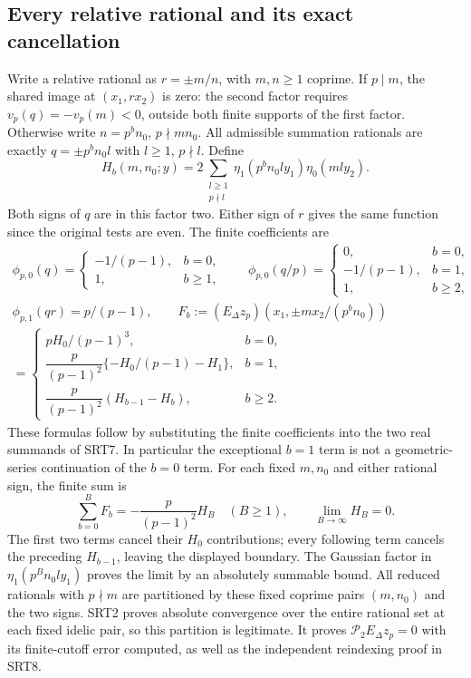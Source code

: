 \subsection{Every relative rational and its exact cancellation}
Write a relative rational as $r=\pm m/n$, with $m,n\ge1$ coprime.
If $p\mid m$, the shared image at $(x_1,rx_2)$ is zero: the second
factor requires $v_p(q)=-v_p(m)<0$, outside both finite supports of
the first factor. Otherwise write $n=p^b n_0$, $p\nmid mn_0$.
All admissible summation rationals are exactly
$q=\pm p^b n_0l$ with $l\ge1$, $p\nmid l$. Define
\begin{equation}\tag{SRT16}
H_b(m,n_0;y)=2\sum_{\substack{l\ge1\\p\nmid l}}
       \eta_1(p^b n_0l y_1)\eta_0(ml y_2).
\end{equation}
Both signs of $q$ are in this factor two. Either sign of $r$
gives the same function since the original tests are even.
The finite coefficients are
\begin{equation}\tag{SRT17}
\begin{gathered}
\phi_{p,0}(q)=
  \begin{cases}-1/(p-1),&b=0,\\1,&b\ge1,\end{cases}
\qquad
\phi_{p,0}(q/p)=
  \begin{cases}0,&b=0,\\-1/(p-1),&b=1,\\1,&b\ge2,\end{cases}\\
\phi_{p,1}(qr)=p/(p-1),\qquad
F_b:=(E_\Delta z_p)(x_1,\pm m x_2/(p^bn_0))\\
=\begin{cases}
 pH_0/(p-1)^3,&b=0,\\
 \dfrac p{(p-1)^2}\{-H_0/(p-1)-H_1\},&b=1,\\
 \dfrac p{(p-1)^2}(H_{b-1}-H_b),&b\ge2.
\end{cases}
\end{gathered}
\end{equation}
These formulas follow by substituting the finite coefficients into
the two real summands of SRT7. In particular the exceptional $b=1$
term is not a geometric-series continuation of the $b=0$ term.
For each fixed $m,n_0$ and either rational sign, the finite sum is
\begin{equation}\tag{SRT18}
\sum_{b=0}^{B}F_b=-\frac p{(p-1)^2}H_B
 \quad(B\ge1),\qquad
\lim_{B\to\infty}H_B=0.
\end{equation}
The first two terms cancel their $H_0$ contributions; every following
term cancels the preceding $H_{b-1}$, leaving the displayed boundary.
The Gaussian factor in $\eta_1(p^Bn_0l y_1)$ proves the limit by an
absolutely summable bound. All reduced rationals with $p\nmid m$
are partitioned by these fixed coprime pairs $(m,n_0)$ and the two
signs. SRT2 proves absolute convergence over the entire rational set
at each fixed idelic pair, so this partition is legitimate. It
proves $\mathcal P_2 E_\Delta z_p=0$ with its finite-cutoff error
computed, as well as the independent reindexing proof in SRT8.

